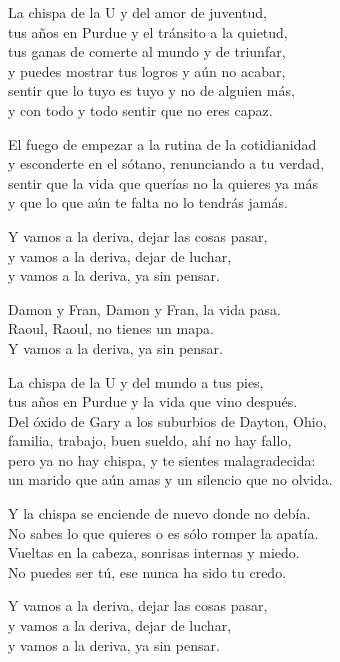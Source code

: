 \begin{lyrics}
La chispa de la U y del amor de juventud,\\
tus años en Purdue y el tránsito a la quietud,\\
tus ganas de comerte al mundo y de triunfar,\\
y puedes mostrar tus logros y aún no acabar,\\
sentir que lo tuyo es tuyo y no de alguien más,\\
y con todo y todo sentir que no eres capaz.

El fuego de empezar a la rutina de la cotidianidad\\
y esconderte en el sótano, renunciando a tu verdad,\\
sentir que la vida que querías no la quieres ya más\\
y que lo que aún te falta no lo tendrás jamás.

Y vamos a la deriva, dejar las cosas pasar,\\
y vamos a la deriva, dejar de luchar,\\
y vamos a la deriva, ya sin pensar.

Damon y Fran, Damon y Fran, la vida pasa.\\
Raoul, Raoul, no tienes un mapa.\\
Y vamos a la deriva, ya sin pensar.

La chispa de la U y del mundo a tus pies,\\
tus años en Purdue y la vida que vino después.\\
Del óxido de Gary a los suburbios de Dayton, Ohio,\\
familia, trabajo, buen sueldo, ahí no hay fallo,\\
pero ya no hay chispa, y te sientes malagradecida:\\
un marido que aún amas y un silencio que no olvida.

Y la chispa se enciende de nuevo donde no debía.\\
No sabes lo que quieres o es sólo romper la apatía.\\
Vueltas en la cabeza, sonrisas internas y miedo.\\
No puedes ser tú, ese nunca ha sido tu credo.

Y vamos a la deriva, dejar las cosas pasar,\\
y vamos a la deriva, dejar de luchar,\\
y vamos a la deriva, ya sin pensar.


\end{lyrics}
